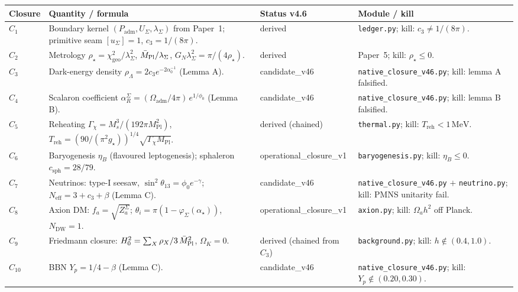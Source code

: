\documentclass[11pt,a4paper]{article}
\begin{document}
\begin{center}
\renewcommand{\arraystretch}{1.18}
\begin{tabularx}{\textwidth}{@{}p{}p{}p{}Y@{}}
\toprule
\textbf{Closure} & \textbf{Quantity / formula} & \textbf{Status v4.6} & \textbf{Module / kill} \\
\midrule
\(C_1\)  & Boundary kernel \((P_{\mathrm{adm}}, U_\Sigma, \lambda_\Sigma)\) from Paper~1; primitive seam \([u_\Sigma]=1\), \(c_3=1/(8\pi)\). & derived & \texttt{ledger.py}; kill: \(c_3\neq 1/(8\pi)\). \\
\(C_2\)  & Metrology \(\rho_\star=\chi_{\mathrm{geo}}^2/\lambda_\Sigma^2\), \(\bar M_{\mathrm{Pl}}/\lambda_\Sigma\), \(G_N\lambda_\Sigma^2=\pi/(4\rho_\star)\). & derived & Paper~5; kill: \(\rho_\star\le 0\). \\
\(C_3\)  & Dark-energy density \(\rho_\Lambda=2c_3 e^{-2\alpha_0^{-1}}\) (Lemma A). & \textsf{candidate\_v46} & \texttt{native\_closure\_v46.py}; kill: lemma A falsified. \\
\(C_4\)  & Scalaron coefficient \(\alpha_R^\Sigma=(\Omega_{\mathrm{adm}}/4\pi)\,e^{1/\phi_0}\) (Lemma B). & \textsf{candidate\_v46} & \texttt{native\_closure\_v46.py}; kill: lemma B falsified. \\
\(C_5\)  & Reheating \(\Gamma_\chi=M_s^3/(192\pi M_{\mathrm{Pl}}^2)\), \(T_{\mathrm{reh}}=(90/(\pi^2 g_\star))^{1/4}\sqrt{\Gamma_\chi M_{\mathrm{Pl}}}\). & derived (chained) & \texttt{thermal.py}; kill: \(T_{\mathrm{reh}}<1\,\mathrm{MeV}\). \\
\(C_6\)  & Baryogenesis \(\eta_B\) (flavoured leptogenesis); sphaleron \(c_{\mathrm{sph}}=28/79\). & operational\_closure\_v1 & \texttt{baryogenesis.py}; kill: \(\eta_B\le 0\). \\
\(C_7\)  & Neutrinos: type-I seesaw, \(\sin^2\theta_{13}=\phi_0 e^{-\gamma}\); \(N_{\mathrm{eff}}=3+c_3+\beta\) (Lemma C). & \textsf{candidate\_v46} & \texttt{native\_closure\_v46.py} \(+\) \texttt{neutrino.py}; kill: PMNS unitarity fail. \\
\(C_8\)  & Axion DM: \(f_a=\sqrt{Z_a^\Sigma}\); \(\theta_i=\pi(1-\varphi_\Sigma(\alpha_\star))\), \(N_{\mathrm{DW}}=1\). & operational\_closure\_v1 & \texttt{axion.py}; kill: \(\Omega_a h^2\) off Planck. \\
\(C_9\)  & Friedmann closure: \(H_0^2=\sum_X\rho_X/3\,\bar M_{\mathrm{Pl}}^2\), \(\Omega_K=0\). & derived (chained from \(C_3\)) & \texttt{background.py}; kill: \(h\notin(0.4,1.0)\). \\
\(C_{10}\)  & BBN \(Y_p=1/4-\beta\) (Lemma C). & \textsf{candidate\_v46} & \texttt{native\_closure\_v46.py}; kill: \(Y_p\notin(0.20,0.30)\). \\

\end{tabularx}
\end{center}
\end{document}
